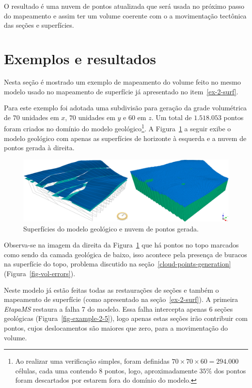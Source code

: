 O resultado é uma nuvem de pontos atualizada que será usada no próximo passo do mapeamento e assim ter um volume coerente com o a movimentação tectônica das seções e superfícies.

\section{Exemplos e resultados}

Nesta seção é mostrado um exemplo de mapeamento do volume feito no mesmo modelo usado no mapeamento de superfície já apresentado no item~\ref{ex-2-surf}.

Para este exemplo foi adotada uma subdivisão para geração da grade volumétrica de $70$ unidades em $x$, $70$ unidades em $y$ e $60$ em $z$. Um total de $1.518.053$ pontos foram criados no domínio do modelo geológico\footnote{Ao realizar uma verificação simples, foram definidas $70\times70\times60=294.000$ células, cada uma contendo $8$ pontos, logo, aproximadamente $35\%$ dos pontos foram descartados por estarem fora do domínio do modelo.}. A Figura~\ref{fig-vol-ex-1} a seguir exibe o modelo geológico com apenas as superfícies de horizonte à esquerda e a nuvem de pontos gerada à direita.

\begin{figure} [H]
  \begin{center}
    \includegraphics[width=\textwidth]{images/fig-vol-ex-1}
    \caption{Superfícies do modelo geológico e nuvem de pontos gerada.}\label{fig-vol-ex-1}
  \end{center}
\end{figure}

Observa-se na imagem da direita da Figura~\ref{fig-vol-ex-1} que há pontos no topo marcados como sendo da camada geológica de baixo, isso acontece pela presença de buracos na superfície do topo, problema discutido na seção~\ref{cloud-points-generation} (Figura~\ref{fig-vol-errors}).

Neste modelo já estão feitas todas as restaurações de seções e também o mapeamento de superfície (como apresentado na seção~\ref{ex-2-surf}). A primeira \emph{EtapaMS} restaura a falha 7 do modelo. Essa falha intercepta apenas 6 seções geológicas (Figura~\ref{fig-example-2-5}), logo apenas estas seções irão contribuir com pontos, cujos deslocamentos são maiores que zero, para a movimentação do volume. 

